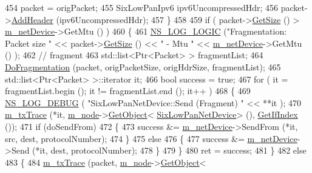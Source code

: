 \begin{DoxyCode}
454       packet = origPacket;
455       SixLowPanIpv6 ipv6UncompressedHdr;
456       packet->\hyperlink{classns3_1_1Packet_a465108c595a0bc592095cbcab1832ed8}{AddHeader} (ipv6UncompressedHdr);
457     \}
458 
459   \textcolor{keywordflow}{if} ( packet->\hyperlink{classns3_1_1Packet_a462855c9929954d4301a4edfe55f4f1c}{GetSize} () > \hyperlink{classns3_1_1SixLowPanNetDevice_a758b615a8b8f811ae3517ab9c7574f7b}{m\_netDevice}->GetMtu () )
460     \{
461       \hyperlink{group__logging_ga88acd260151caf2db9c0fc84997f45ce}{NS\_LOG\_LOGIC} (\textcolor{stringliteral}{"Fragmentation: Packet size "} << packet->\hyperlink{classns3_1_1Packet_a462855c9929954d4301a4edfe55f4f1c}{GetSize} () << \textcolor{stringliteral}{" - Mtu "} << 
      \hyperlink{classns3_1_1SixLowPanNetDevice_a758b615a8b8f811ae3517ab9c7574f7b}{m\_netDevice}->GetMtu () );
462       \textcolor{comment}{// fragment}
463       std::list<Ptr<Packet> > fragmentList;
464       \hyperlink{classns3_1_1SixLowPanNetDevice_a88e96024b9eb0c0184c9c1ef26e3aa16}{DoFragmentation} (packet, origPacketSize, origHdrSize, fragmentList);
465       std::list<Ptr<Packet> >::iterator it;
466       \textcolor{keywordtype}{bool} success = \textcolor{keyword}{true};
467       \textcolor{keywordflow}{for} ( it = fragmentList.begin (); it != fragmentList.end (); it++ )
468         \{
469           \hyperlink{group__logging_ga413f1886406d49f59a6a0a89b77b4d0a}{NS\_LOG\_DEBUG} ( \textcolor{stringliteral}{"SixLowPanNetDevice::Send (Fragment) "} << **it );
470           \hyperlink{classns3_1_1SixLowPanNetDevice_a6d80896d0b58fd8a5577c65a060ad3b1}{m\_txTrace} (*it, \hyperlink{classns3_1_1SixLowPanNetDevice_a3f287ff63be440ab2978697b1d9b26a5}{m\_node}->\hyperlink{classns3_1_1Object_a13e18c00017096c8381eb651d5bd0783}{GetObject}<
      \hyperlink{classns3_1_1SixLowPanNetDevice_afb90a509d87f24373689a40f459d7ff6}{SixLowPanNetDevice}> (), \hyperlink{classns3_1_1SixLowPanNetDevice_a48cd7b76a59b506df8d8a7d8604f66b3}{GetIfIndex} ());
471           \textcolor{keywordflow}{if} (doSendFrom)
472             \{
473               success &= \hyperlink{classns3_1_1SixLowPanNetDevice_a758b615a8b8f811ae3517ab9c7574f7b}{m\_netDevice}->SendFrom (*it, src, dest, protocolNumber);
474             \}
475           \textcolor{keywordflow}{else}
476             \{
477               success &= \hyperlink{classns3_1_1SixLowPanNetDevice_a758b615a8b8f811ae3517ab9c7574f7b}{m\_netDevice}->Send (*it, dest, protocolNumber);
478             \}
479         \}
480       ret = success;
481     \}
482   \textcolor{keywordflow}{else}
483     \{
484       \hyperlink{classns3_1_1SixLowPanNetDevice_a6d80896d0b58fd8a5577c65a060ad3b1}{m\_txTrace} (packet, \hyperlink{classns3_1_1SixLowPanNetDevice_a3f287ff63be440ab2978697b1d9b26a5}{m\_node}->\hyperlink{classns3_1_1Object_a13e18c00017096c8381eb651d5bd0783}{GetObject}<

\end{DoxyCode}
